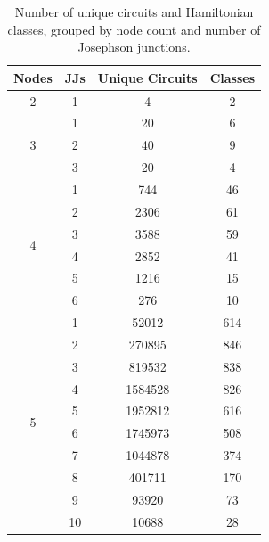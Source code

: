 \begin{table}[htbp]
\centering
\setlength{\tabcolsep}{14pt}
\begin{tabular}{cccc}
\toprule
Nodes & JJs & Unique Circuits & Classes \\ \toprule
\multirow{1}{*}{2}& 1 & 4 & 2 \\
\midrule
\multirow{3}{*}{3}& 1 & 20 & 6 \\
& 2 & 40 & 9 \\
& 3 & 20 & 4 \\
\midrule
\multirow{6}{*}{4}& 1 & 744 & 46 \\
& 2 & 2306 & 61 \\
& 3 & 3588 & 59 \\
& 4 & 2852 & 41 \\
& 5 & 1216 & 15 \\
& 6 & 276 & 10 \\
\midrule
\multirow{10}{*}{5}& 1 & 52012 & 614 \\
& 2 & 270895 & 846 \\
& 3 & 819532 & 838 \\
& 4 & 1584528 & 826 \\
& 5 & 1952812 & 616 \\
& 6 & 1745973 & 508 \\
& 7 & 1044878 & 374 \\
& 8 & 401711 & 170 \\
& 9 & 93920 & 73 \\
& 10 & 10688 & 28 \\
\bottomrule
\end{tabular}
\caption{Number of unique circuits and Hamiltonian classes, grouped by node count and number of Josephson junctions.}
    \label{tab:granular_overview}
\end{table}

